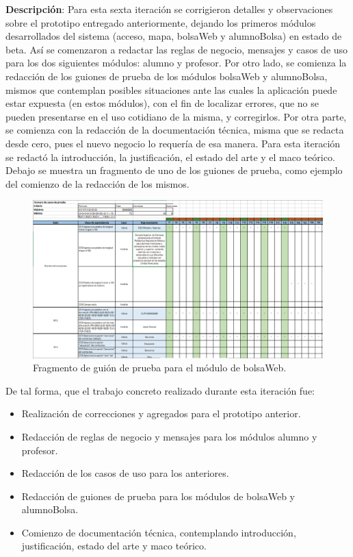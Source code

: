 \noindent
\textbf{Descripción}: Para esta sexta iteración se corrigieron detalles y observaciones sobre el prototipo entregado anteriormente, dejando los primeros módulos desarrollados del sistema (acceso, mapa, bolsaWeb y alumnoBolsa) en estado de beta. Así se comenzaron a redactar las reglas de negocio, mensajes y casos de uso para los dos siguientes módulos: alumno y profesor. Por otro lado, se comienza la redacción de los guiones de prueba de los módulos bolsaWeb y alumnoBolsa, mismos que contemplan posibles situaciones ante las cuales la aplicación puede estar expuesta (en estos módulos), con el fin de localizar errores, que no se pueden presentarse en el uso cotidiano de la misma, y corregirlos.
\newline
Por otra parte, se comienza con la redacción de la documentación técnica, misma que se redacta desde cero, pues el nuevo negocio lo requería de esa manera. Para esta iteración se redactó la introducción, la justificación, el estado del arte y el maco teórico.
\newline
Debajo se muestra un fragmento de uno de los guiones de prueba, como ejemplo del comienzo de la redacción de los mismos. 
\begin{figure}[!htpb]
	\hypertarget{fig:guion_prueba}{\hspace{1pt}}
	\begin{center}
		\includegraphics[width=1\textwidth]{images/reporte/guionPrueba.png}
		\caption{Fragmento de guión de prueba para el módulo de bolsaWeb.}
		\label{fig:guion_prueba}
	\end{center}
\end{figure}

De tal forma, que el trabajo concreto realizado durante esta iteración fue:
\begin{itemize}
	\item Realización de correcciones y agregados para el prototipo anterior.
	\item Redacción de reglas de negocio y mensajes para los módulos alumno y profesor.
	\item Redacción de los casos de uso para los anteriores.
	\item Redacción de guiones de prueba para los módulos de bolsaWeb y alumnoBolsa.
	\item Comienzo de documentación técnica, contemplando introducción, justificación, estado del arte y maco teórico.
\end{itemize}


